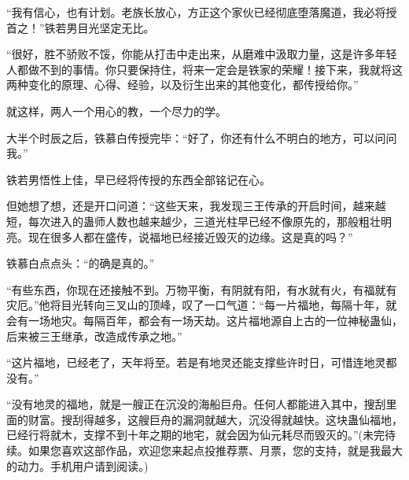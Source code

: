 \begin{this_body}
“我有信心，也有计划。老族长放心，方正这个家伙已经彻底堕落魔道，我必将授首之！”铁若男目光坚定无比。

“很好，胜不骄败不馁，你能从打击中走出来，从磨难中汲取力量，这是许多年轻人都做不到的事情。你只要保持住，将来一定会是铁家的荣耀！接下来，我就将这两种变化的原理、心得、经验，以及衍生出来的其他变化，都传授给你。”

就这样，两人一个用心的教，一个尽力的学。

大半个时辰之后，铁慕白传授完毕：“好了，你还有什么不明白的地方，可以问问我。”

铁若男悟性上佳，早已经将传授的东西全部铭记在心。

但她想了想，还是开口问道：“这些天来，我发现三王传承的开启时间，越来越短，每次进入的蛊师人数也越来越少，三道光柱早已经不像原先的，那般粗壮明亮。现在很多人都在盛传，说福地已经接近毁灭的边缘。这是真的吗？”

铁慕白点点头：“的确是真的。”

“有些东西，你现在还接触不到。万物平衡，有阴就有阳，有水就有火，有福就有灾厄。”他将目光转向三叉山的顶峰，叹了一口气道：“每一片福地，每隔十年，就会有一场地灾。每隔百年，都会有一场天劫。这片福地源自上古的一位神秘蛊仙，后来被三王继承，改造成传承之地。”

“这片福地，已经老了，天年将至。若是有地灵还能支撑些许时日，可惜连地灵都没有。”

“没有地灵的福地，就是一艘正在沉没的海船巨舟。任何人都能进入其中，搜刮里面的财富。搜刮得越多，这艘巨舟的漏洞就越大，沉没得就越快。这块蛊仙福地，已经行将就木，支撑不到十年之期的地宅，就会因为仙元耗尽而毁灭的。”(未完待续。如果您喜欢这部作品，欢迎您来起点投推荐票、月票，您的支持，就是我最大的动力。手机用户请到阅读。)

\end{this_body}

